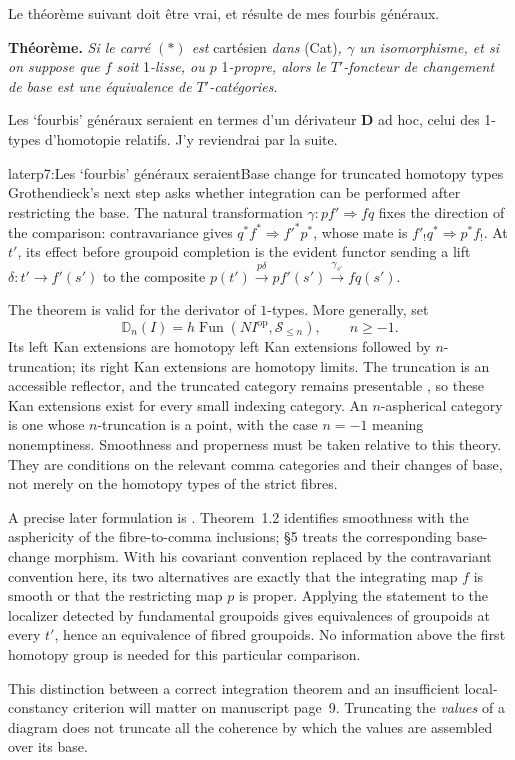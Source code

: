 Le théorème suivant doit être vrai, et résulte de mes fourbis généraux.

\textbf{Théorème.} \textit{Si le carré $(*)$ est} cartésien \textit{dans} (Cat)\textit{, $\gamma$ un isomorphisme, et si on suppose que $f$ soit} 1\textit{-lisse, ou $p$} 1\textit{-propre, alors le $T'$-foncteur de changement de base est une équivalence de $T'$-catégories.}

Les ‘fourbis’ généraux seraient en termes d'un dérivateur $\mathbf{D}$ ad hoc, celui des 1-types d'homotopie relatifs. J'y reviendrai par la suite.

\begin{dcomment}{later}{p7:Les ‘fourbis’ généraux seraient}{Base change for truncated homotopy types}
Grothendieck's next step asks whether integration can be performed after restricting the base. The natural transformation $\gamma:pf'\Rightarrow fq$ fixes the direction of the comparison: contravariance gives $q^*f^*\Rightarrow f'^*p^*$, whose mate is $f'_!q^*\Rightarrow p^*f_!$. At $t'$, its effect before groupoid completion is the evident functor sending a lift $\delta:t'\to f'(s')$ to the composite $p(t')\xrightarrow{p\delta}pf'(s')\xrightarrow{\gamma_{s'}}fq(s')$.

The theorem is valid for the derivator of $1$-types. More generally, set
\[
 \mathbb D_n(I)=h\operatorname{Fun}(NI^{\mathrm{op}},\mathcal S_{\leq n}),
 \qquad n\geq-1.
\]
Its left Kan extensions are homotopy left Kan extensions followed by $n$-truncation; its right Kan extensions are homotopy limits. The truncation is an accessible reflector, and the truncated category remains presentable \citep[Proposition~5.5.6.18 and Remark~5.5.6.21]{Lurie2009HTT}, so these Kan extensions exist for every small indexing category. An $n$-aspherical category is one whose $n$-truncation is a point, with the case $n=-1$ meaning nonemptiness. Smoothness and properness must be taken relative to this theory. They are conditions on the relevant comma categories and their changes of base, not merely on the homotopy types of the strict fibres.

A precise later formulation is \citet[Theorem~1.2, Corollary~4.16, Example~4.17, and \S5]{Maltsiniotis2005Asphericite}. Theorem~1.2 identifies smoothness with the asphericity of the fibre-to-comma inclusions; \S5 treats the corresponding base-change morphism. With his covariant convention replaced by the contravariant convention here, its two alternatives are exactly that the integrating map $f$ is smooth or that the restricting map $p$ is proper. Applying the statement to the localizer detected by fundamental groupoids gives equivalences of groupoids at every $t'$, hence an equivalence of fibred groupoids. No information above the first homotopy group is needed for this particular comparison.

This distinction between a correct integration theorem and an insufficient local-constancy criterion will matter on manuscript page~9. Truncating the \emph{values} of a diagram does not truncate all the coherence by which the values are assembled over its base.
\end{dcomment}



